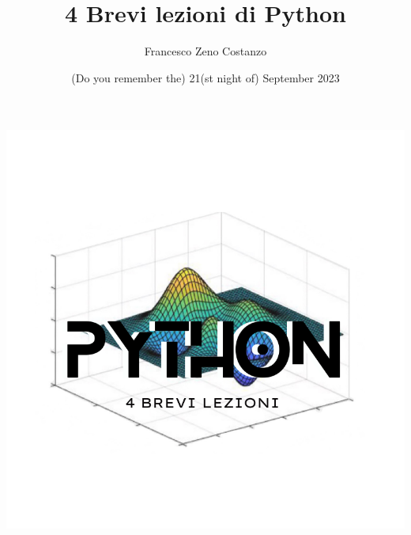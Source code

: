 \documentclass[10pt,a4paper]{article}
\author{{\LARGE Francesco Zeno Costanzo}}
\title{{\Huge 4 Brevi lezioni di Python}}
\date{(Do you remember the) 21(st night of) September 2023}
\begin{document}
\maketitle
%
%
%
%
%
%


\begin{center}
\includegraphics[scale=1]{img/logo.pdf}
\end{center}
\end{document}
